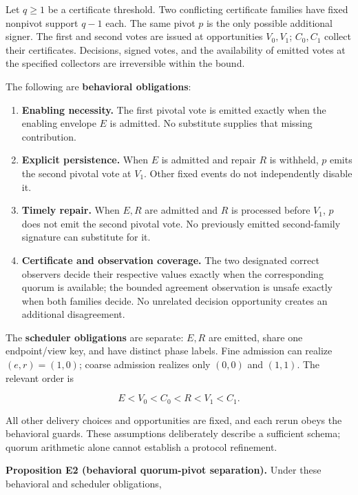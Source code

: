Let \(q\ge1\) be a certificate threshold. Two conflicting certificate
families have fixed nonpivot support \(q-1\) each. The same pivot \(p\)
is the only possible additional signer. The first and second votes are
issued at opportunities \(V_0,V_1\); \(C_0,C_1\) collect their
certificates. Decisions, signed votes, and the availability of emitted
votes at the specified collectors are irreversible within the bound.

The following are \textbf{behavioral obligations}:

\begin{enumerate}
\def\labelenumi{\arabic{enumi}.}
\tightlist
\item
  \textbf{Enabling necessity.} The first pivotal vote is emitted exactly
  when the enabling envelope \(E\) is admitted. No substitute supplies
  that missing contribution.
\item
  \textbf{Explicit persistence.} When \(E\) is admitted and repair \(R\)
  is withheld, \(p\) emits the second pivotal vote at \(V_1\). Other
  fixed events do not independently disable it.
\item
  \textbf{Timely repair.} When \(E,R\) are admitted and \(R\) is
  processed before \(V_1\), \(p\) does not emit the second pivotal vote.
  No previously emitted second-family signature can substitute for it.
\item
  \textbf{Certificate and observation coverage.} The two designated
  correct observers decide their respective values exactly when the
  corresponding quorum is available; the bounded agreement observation
  is unsafe exactly when both families decide. No unrelated decision
  opportunity creates an additional disagreement.
\end{enumerate}

The \textbf{scheduler obligations} are separate: \(E,R\) are emitted,
share one endpoint/view key, and have distinct phase labels. Fine
admission can realize \((e,r)=(1,0)\); coarse admission realizes only
\((0,0)\) and \((1,1)\). The relevant order is

\[
E<V_0<C_0<R<V_1<C_1.
\]

All other delivery choices and opportunities are fixed, and each rerun
obeys the behavioral guards. These assumptions deliberately describe a
sufficient schema; quorum arithmetic alone cannot establish a protocol
refinement.

\textbf{Proposition E2 (behavioral quorum-pivot separation).} Under
these behavioral and scheduler obligations,

